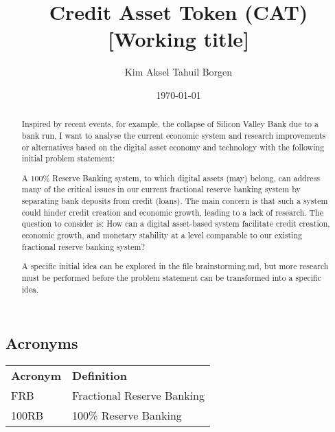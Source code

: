 \documentclass{article}
\title{Credit Asset Token (CAT) [Working title]}
\author{Kim Aksel Tahuil Borgen}
\date{\today}
\begin{document}
\maketitle
\begin{abstract}
    Inspired by recent events, for example, the collapse of Silicon Valley Bank due to a bank run, I want to analyse the current economic system and research improvements or alternatives based on the digital asset economy and technology with the following initial problem statement:

    A 100\% Reserve Banking system, to which digital assets (may) belong, can address many of the critical issues in our current fractional reserve banking system by separating bank deposits from credit (loans). The main concern is that such a system could hinder credit creation and economic growth, leading to a lack of research. The question to consider is: How can a digital asset-based system facilitate credit creation, economic growth, and monetary stability at a level comparable to our existing fractional reserve banking system? 
    
    A specific initial idea can be explored in the file brainstorming.md, but more research must be performed before the problem statement can be transformed into a specific idea. 
\end{abstract}

\subsection{Acronyms}

\begin{tabular}{ll}
\textbf{Acronym} & \textbf{Definition} \\
FRB & Fractional Reserve Banking \\
100RB & 100\% Reserve Banking \\
\end{tabular}


\printbibliography
\end{document}
